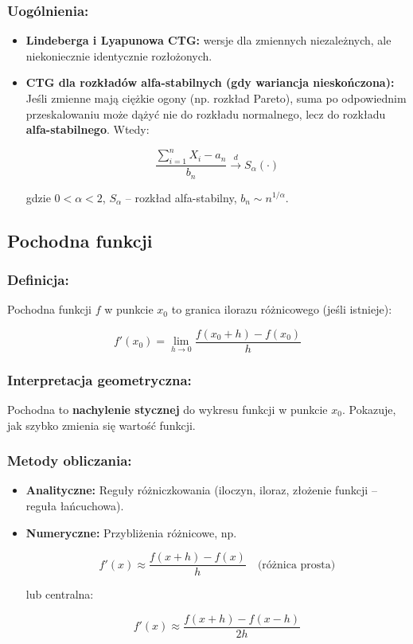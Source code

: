 \subsubsection*{Uogólnienia:}
\begin{itemize}
    \item \textbf{Lindeberga i Lyapunowa CTG:} wersje dla zmiennych niezależnych, ale niekoniecznie identycznie rozłożonych.
    \item \textbf{CTG dla rozkładów alfa-stabilnych (gdy wariancja nieskończona):}
    Jeśli zmienne mają ciężkie ogony (np. rozkład Pareto), suma po odpowiednim przeskalowaniu może dążyć nie do rozkładu normalnego, lecz do rozkładu \textbf{alfa-stabilnego}.
    Wtedy:

  $$
  \frac{\sum_{i=1}^n X_i - a_n}{b_n} \xrightarrow{d} S_\alpha(\cdot)
  $$

  gdzie $0 < \alpha < 2$, $S_\alpha$ -- rozkład alfa-stabilny, $b_n \sim n^{1/\alpha}$.
\end{itemize}

\subsection{Pochodna funkcji}

\subsubsection*{Definicja:}
Pochodna funkcji $f$ w punkcie $x_0$ to granica ilorazu różnicowego (jeśli istnieje):

$$
f'(x_0) = \lim_{h \to 0} \frac{f(x_0 + h) - f(x_0)}{h}
$$

\subsubsection*{Interpretacja geometryczna:}
Pochodna to \textbf{nachylenie stycznej} do wykresu funkcji w punkcie $x_0$. Pokazuje, jak szybko zmienia się wartość funkcji.

\subsubsection*{Metody obliczania:}
\begin{itemize}
    \item \textbf{Analityczne:} Reguły różniczkowania (iloczyn, iloraz, złożenie funkcji -- reguła łańcuchowa).
    \item \textbf{Numeryczne:} Przybliżenia różnicowe, np.

  $$
  f'(x) \approx \frac{f(x+h) - f(x)}{h} \quad \text{(różnica prosta)}
  $$

  lub centralna:

  $$
  f'(x) \approx \frac{f(x+h) - f(x-h)}{2h}
  $$
\end{itemize}

